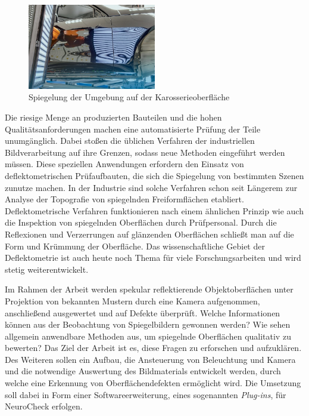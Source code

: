 {
	\begin{figure}[H]
		\centering
		\includegraphics[width=0.5\textwidth]{01_einfuehrung/figures/spiegelndeKarosserie}
		\caption[Spiegelnde Karosserieoberfläche]{Spiegelung der Umgebung auf der Karosserieoberfläche \cite{spiegelndeKarosserieImg}}
		\label{img:spiegelndeKarosserie}
	\end{figure}
}

\noindent
Die riesige Menge an produzierten Bauteilen und die hohen Qualitätsanforderungen machen eine automatisierte Prüfung der Teile unumgänglich.
Dabei stoßen die üblichen Verfahren der industriellen Bildverarbeitung auf ihre Grenzen, sodass neue Methoden eingeführt werden müssen.
Diese speziellen Anwendungen erfordern den Einsatz von deflektometrischen Prüfaufbauten, die sich die Spiegelung von bestimmten Szenen zunutze machen.
In der Industrie sind solche Verfahren schon seit Längerem zur Analyse der Topografie von spiegelnden Freiformflächen etabliert.
Deflektometrische Verfahren funktionieren nach einem ähnlichen Prinzip wie auch die Inspektion von spiegelnden Oberflächen durch Prüfpersonal. 
Durch die Reflexionen und Verzerrungen auf glänzenden Oberflächen schließt man auf die Form und Krümmung der Oberfläche.
Das wissenschaftliche Gebiet der Deflektometrie ist auch heute noch Thema für viele Forschungsarbeiten und wird stetig weiterentwickelt.

\p
Im Rahmen der Arbeit werden spekular reflektierende Objektoberflächen unter Projektion von bekannten Mustern durch eine Kamera aufgenommen, anschließend ausgewertet und auf Defekte überprüft.
Welche Informationen können aus der Beobachtung von Spiegelbildern gewonnen werden?
Wie sehen allgemein anwendbare Methoden aus, um spiegelnde Oberflächen qualitativ zu bewerten?
Das Ziel der Arbeit ist es, diese Fragen zu erforschen und aufzuklären.
Des Weiteren sollen ein Aufbau, die Ansteuerung von Beleuchtung und Kamera und die notwendige Auswertung des Bildmaterials entwickelt werden, durch welche eine Erkennung von Oberflächendefekten ermöglicht wird.
Die Umsetzung soll dabei in Form einer Softwareerweiterung, eines sogenannten \textit{Plug-ins}, für NeuroCheck erfolgen.

